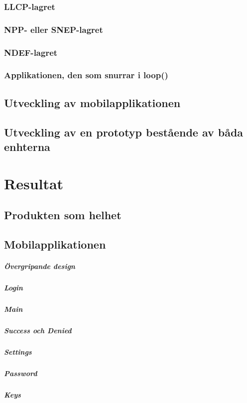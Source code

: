 \documentclass[11pt]{article}
\begin{document}
\subsubsection{LLCP-lagret}

\subsubsection{NPP- eller SNEP-lagret}

\subsubsection{NDEF-lagret}

\subsubsection{Applikationen, den som snurrar i loop()}

\subsection{Utveckling av mobilapplikationen}

\subsection{Utveckling av en prototyp bestående av båda enhterna}

\section{Resultat}

\subsection{Produkten som helhet}

\subsection{Mobilapplikationen}

\subparagraph{Övergripande design}

\subparagraph{Login}

\subparagraph{Main}

\subparagraph{Success och Denied}

\subparagraph{Settings}

\subparagraph{Password}

\subparagraph{Keys}
\end{document}
